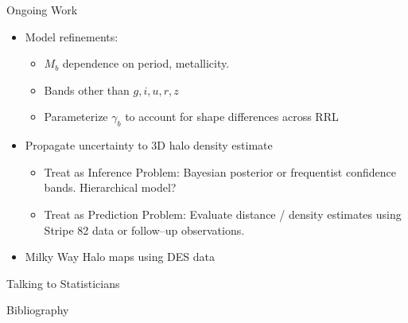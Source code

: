 \documentclass[12pt]{beamer}
\begin{document}
\begin{frame}{Ongoing Work}
\begin{itemize}
\item Model refinements:
\begin{itemize}
\item $M_b$ dependence on period, metallicity.
\item Bands other than $g,i,u,r,z$
\item Parameterize $\gamma_b$ to account for shape differences across RRL
\end{itemize}
\item Propagate uncertainty to 3D halo density estimate
\begin{itemize}
\item Treat as Inference Problem: Bayesian posterior or frequentist confidence bands. Hierarchical model?
\item Treat as Prediction Problem: Evaluate distance / density estimates using Stripe 82 data or follow--up observations.
\end{itemize}
\item Milky Way Halo maps using DES data
\end{itemize}
\end{frame}







\begin{frame}{Talking to Statisticians}

\end{frame}




\begin{frame}[allowframebreaks]{Bibliography}
 
  \tiny{
  }
\end{frame}
\end{document}
